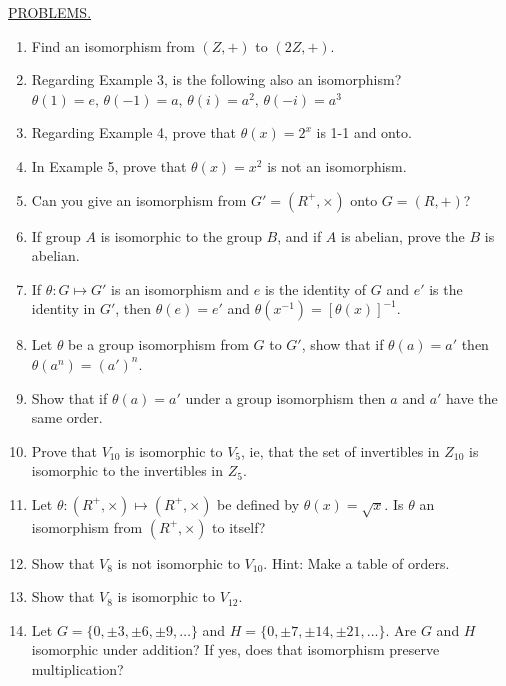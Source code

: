 \documentclass[12pt]{book}
\theoremstyle{definition}
\begin{document}
\underline{PROBLEMS.}
\begin{enumerate}
\item Find an isomorphism from $(Z,+)$ to $(2Z,+)$.
\item Regarding Example 3, is the following also an isomorphism? $\theta(1)=e,\, \theta(-1)=a,\, \theta(i)=a^2,\, \theta(-i)=a^3$
\item Regarding Example 4, prove that $\theta(x)=2^x$ is 1-1 and onto.
\item In Example 5, prove that $\theta(x)=x^2$ is not an isomorphism.
\item Can you give an isomorphism from $G'=(R^+,\times)$ onto $G=(R,+)$?
\item If group $A$ is isomorphic to the group $B$, and if $A$ is abelian, prove the $B$ is abelian.
\item If $\theta:G\mapsto G'$ is an isomorphism and $e$ is the identity of $G$ and $e'$ is the identity in $G'$, then $\theta(e)=e'$ and $\theta(x^{-1})=[\theta(x)]^{-1}$.
\item Let $\theta$ be a group isomorphism from $G$ to $G'$, show that if $\theta(a)=a'$ then $\theta(a^n)=(a')^n$.
\item Show that if $\theta(a)=a'$ under a group isomorphism then $a$ and $a'$ have the same order.
\item Prove that $V_{10}$ is isomorphic to $V_5$, ie, that the set of invertibles in $Z_{10}$ is isomorphic to the invertibles in $Z_5$.
\item Let $\theta:(R^+,\times)\mapsto(R^+,\times)$ be defined by $\theta(x)=\sqrt x$.  Is $\theta$ an isomorphism from $(R^+,\times)$ to itself?
\item Show that $V_8$ is not isomorphic to $V_{10}$.  Hint: Make a table of orders.
\item Show that $V_8$ is isomorphic to $V_{12}$.
\item Let $G=\{0,\pm3,\pm6, \pm9,\dots\}$ and $H=\{0,\pm7,\pm14,\pm21,\dots\}$.  Are $G$ and $H$ isomorphic under addition?  If yes, does that isomorphism preserve multiplication?
\end{enumerate}
\end{document}
